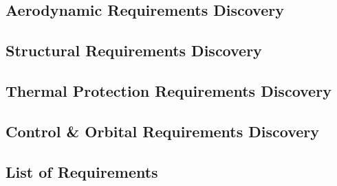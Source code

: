 \subsection{Aerodynamic Requirements Discovery}

\subsection{Structural Requirements Discovery}

\subsection{Thermal Protection Requirements Discovery}

\subsection{Control \& Orbital Requirements Discovery}

\subsection{List of Requirements}


